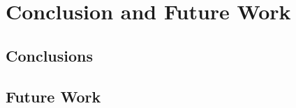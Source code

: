 \chapter{Conclusion and Future Work}
\label{ch:conclusion}

\section{Conclusions}
\label{sec:conc-conclusions}

\section{Future Work}
\label{sec:conc-future}
